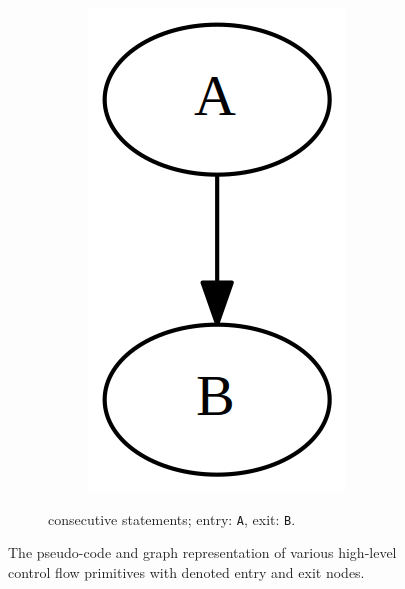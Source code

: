 \begin{figure}[htbp]
\begin{subfigure}[ht]{0.24\textwidth}
\begin{subfigure}[ht]{0.35\textwidth}
			\includegraphics[width=\textwidth]{inc/primitives/seq.png}
		\end{subfigure}
		\caption{consecutive statements; entry: \texttt{A}, exit: \texttt{B}.}
		\label{fig:seq_graph_representation}
	\end{subfigure}
	\caption{The pseudo-code and graph representation of various high-level control flow primitives with denoted entry and exit nodes.}
	\label{fig:graph_representations}
\end{figure}


